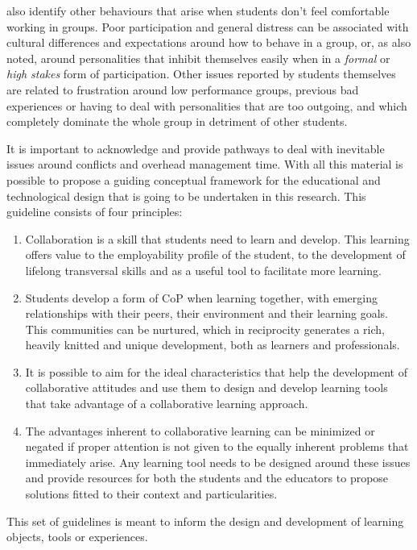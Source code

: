 \textcite{jaques_2007} also identify other behaviours that arise when students don't feel comfortable working in groups. Poor participation and general distress can be associated with cultural differences and expectations around how to behave in a group, or, as \textcite{biggs_2022} also noted, around
personalities that inhibit themselves easily when in a \emph{formal} or \emph{high stakes} form of participation. Other issues reported by students themselves are related to frustration around low performance groups, previous bad experiences or having to deal with personalities that are too outgoing,
and which completely dominate the whole group in detriment of other students.

It is important to acknowledge and provide pathways to deal with inevitable issues around conflicts and overhead management time. With all this material is possible to propose a guiding conceptual framework for the educational and technological design that is going to be undertaken in this research. This
guideline consists of four principles:

\begin{enumerate}
    \item Collaboration is a skill that students need to learn and develop. This learning offers value to the employability profile of the student, to the development of lifelong transversal skills and as a useful tool to facilitate more learning.
    \item Students develop a form of \ac{CoP} when learning together, with emerging relationships with their peers, their environment and their learning goals. This communities can be nurtured, which in reciprocity generates a rich, heavily knitted and unique development, both as learners and professionals.
    \item It is possible to aim for the ideal characteristics that help the development of collaborative attitudes and use them to design and develop learning tools that take advantage of a collaborative learning approach.
    \item The advantages inherent to collaborative learning can be minimized or negated if proper attention is not given to the equally inherent problems that immediately arise. Any learning tool needs to be designed around these issues and provide resources for both the students and the educators to propose
    solutions fitted to their context and particularities.
\end{enumerate}

This set of guidelines is meant to inform the design and development of learning objects, tools or experiences.

